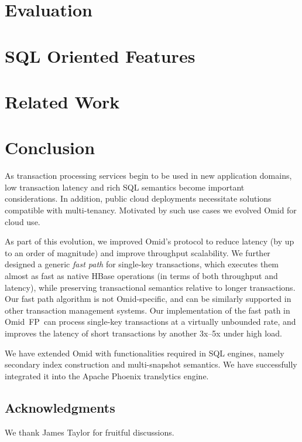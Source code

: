 \documentclass{vldb}
\newcommand{\sys}{Omid~FP}
\begin{document}
\section{Evaluation} \label{sec:eval}


\vspace{-0.3cm}
\section{SQL Oriented Features} \label{sec:sql}

\vspace{-0.3cm}
\section{Related Work} \label{sec:related}

\vspace{-0.3cm}
\section{Conclusion} \label{sec:conclusions}
\vspace{-0.2cm}

As transaction processing services begin to be used in 
new application domains, low transaction latency and rich SQL semantics
become important considerations. In addition, public cloud deployments 
necessitate solutions compatible with multi-tenancy.
Motivated by such use cases we evolved Omid for cloud use.

As part of this evolution, we
improved Omid's protocol to reduce latency (by up to an order of magnitude) and improve throughput scalability.
%
We further designed a generic \emph{fast path} for single-key transactions, 
which executes them  almost as fast as native HBase operations (in terms of 
both throughput and latency), while preserving
transactional semantics relative to longer transactions.
Our fast path algorithm is not Omid-specific, and can be similarly supported in 
other transaction management systems.
Our implementation of the fast path in \sys\ can process single-key
transactions  at a virtually unbounded rate, and improves the latency of short transactions
by another 3x--5x under high load.

We have extended Omid with functionalities required in SQL engines, namely 
secondary index construction and multi-snapshot semantics. 
We have successfully integrated it into the Apache Phoenix translytics engine. 

\subsection*{Acknowledgments}
We thank James Taylor for fruitful discussions. 




\end{document}
